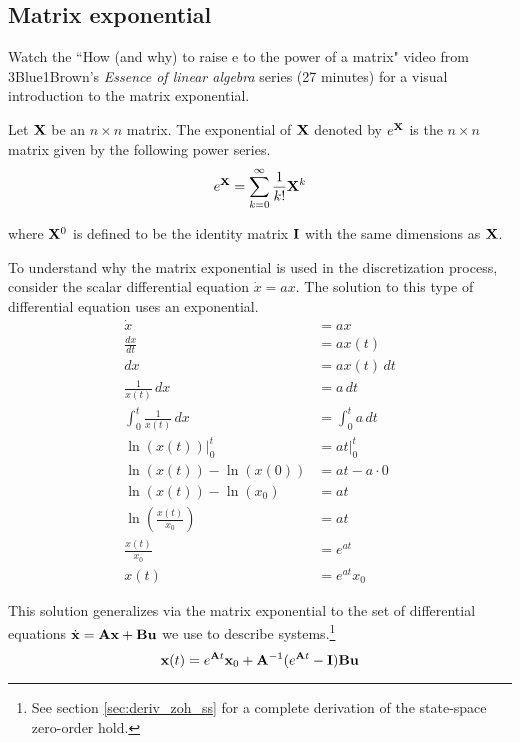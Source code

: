 \subsection{Matrix exponential}
\begin{remark}
  Watch the ``How (and why) to raise e to the power of a matrix" video from
  3Blue1Brown's \textit{Essence of linear algebra} series (27 minutes)
  \cite{bib:linalg_matrix_exp} for a visual introduction to the matrix
  exponential.
\end{remark}
\begin{definition}
  Let $\mathbf{X}$ be an $n \times n$ matrix. The exponential of $\mathbf{X}$ denoted
  by $e^{\mathbf{X}}$ is the $n \times n$ matrix given by the following power
  series.
  \begin{equation}
    e^{\mathbf{X}} = \sum_{k=0}^\infty \frac{1}{k!} \mathbf{X}^k \label{eq:mat_exp}
  \end{equation}

  where $\mathbf{X}^0$ is defined to be the identity matrix $\mathbf{I}$ with the same
  dimensions as $\mathbf{X}$.
\end{definition}

To understand why the matrix exponential is used in the \gls{discretization}
process, consider the scalar differential equation $\dot{x} = ax$. The solution
to this type of differential equation uses an exponential.
\begin{align*}
  \dot{x} &= ax \\
  \frac{dx}{dt} &= ax(t) \\
  dx &= ax(t) \,dt \\
  \frac{1}{x(t)} \,dx &= a \,dt \\
  \int_0^t \frac{1}{x(t)} \,dx &= \int_0^t a \,dt \\
  \ln(x(t)) \rvert_0^t &= at \rvert_0^t \\
  \ln(x(t)) - \ln(x(0)) &= at - a \cdot 0 \\
  \ln(x(t)) - \ln(x_0) &= at \\
  \ln\left(\frac{x(t)}{x_0}\right) &= at \\
  \frac{x(t)}{x_0} &= e^{at} \\
  x(t) &= e^{at} x_0
\end{align*}

This solution generalizes via the matrix exponential to the set of differential
equations $\dot{\mathbf{x}} = \mathbf{A}\mathbf{x} + \mathbf{B}\mathbf{u}$ we use to describe
\glspl{system}.\footnote{See section \ref{sec:deriv_zoh_ss} for a complete
derivation of the state-space zero-order hold.}
\begin{equation*}
  \mathbf{x}(t) = e^{\mathbf{A}t} \mathbf{x}_0 +
    \mathbf{A}^{-1}(e^{\mathbf{A}t} - \mathbf{I})\mathbf{B} \mathbf{u}
\end{equation*}

